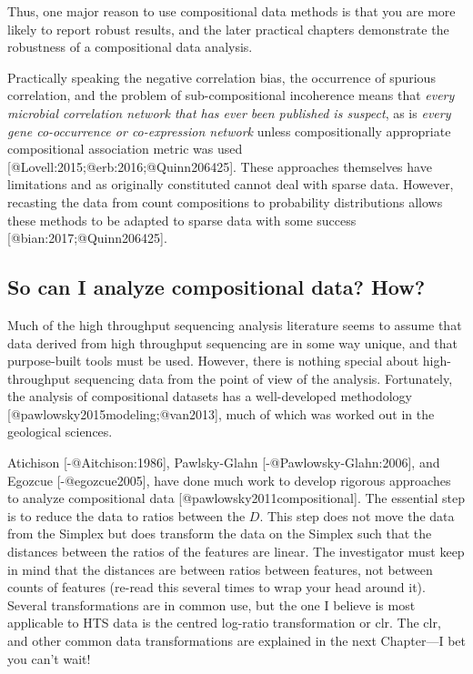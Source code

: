 \documentclass[
  onecolumn]{article}
\begin{document}
Thus, one major reason to use compositional data methods is that you are more likely to report robust results, and the later practical chapters demonstrate the robustness of a compositional data analysis.

Practically speaking the negative correlation bias, the occurrence of spurious correlation, and the problem of sub-compositional incoherence means that \emph{every microbial correlation network that has ever been published is suspect}, as is \emph{every gene co-occurrence or co-expression network} unless compositionally appropriate compositional association metric was used {[}@Lovell:2015;@erb:2016;@Quinn206425{]}. These approaches themselves have limitations and as originally constituted cannot deal with sparse data. However, recasting the data from count compositions to probability distributions allows these methods to be adapted to sparse data with some success {[}@bian:2017;@Quinn206425{]}.

\hypertarget{so-can-i-analyze-compositional-data-how}{%
\subsection{So can I analyze compositional data? How?}\label{so-can-i-analyze-compositional-data-how}}

Much of the high throughput sequencing analysis literature seems to assume that data derived from high throughput sequencing are in some way unique, and that purpose-built tools must be used. However, there is nothing special about high-throughput sequencing data from the point of view of the analysis. Fortunately, the analysis of compositional datasets has a well-developed methodology {[}@pawlowsky2015modeling;@van2013{]}, much of which was worked out in the geological sciences.

Atichison {[}-@Aitchison:1986{]}, Pawlsky-Glahn {[}-@Pawlowsky-Glahn:2006{]}, and Egozcue {[}-@egozcue2005{]}, have done much work to develop rigorous approaches to analyze compositional data {[}@pawlowsky2011compositional{]}. The essential step is to reduce the data to ratios between the \(D\). This step does not move the data from the Simplex but does transform the data on the Simplex such that the distances between the ratios of the features are linear. The investigator must keep in mind that the distances are between ratios between features, not between counts of features (re-read this several times to wrap your head around it). Several transformations are in common use, but the one I believe is most applicable to HTS data is the centred log-ratio transformation or clr. The clr, and other common data transformations are explained in the next Chapter---I bet you can't wait!
\end{document}
